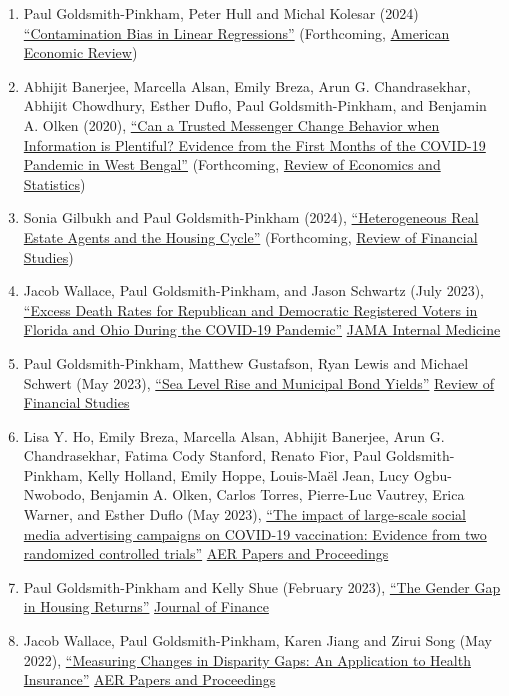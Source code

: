 \documentclass[letterpaper]{article}
\begin{document}
\begin{enumerate}
  \item Paul Goldsmith-Pinkham, Peter Hull and Michal Kolesar (2024) \href{https://arxiv.org/abs/2106.05024}{``Contamination Bias in Linear Regressions''} (Forthcoming, \ul{American Economic Review})
  \item Abhijit Banerjee, Marcella Alsan, Emily Breza, Arun G. Chandrasekhar, Abhijit Chowdhury, Esther Duflo, Paul Goldsmith-Pinkham, and Benjamin A. Olken (2020), \href{https://economics.mit.edu/sites/default/files/2022-08/wb_manuscript_final.pdf}{``Can a Trusted Messenger Change Behavior when Information is Plentiful? Evidence from the First Months of the COVID-19 Pandemic in West Bengal''}  (Forthcoming, \ul{Review of Economics and Statistics})
  \item Sonia Gilbukh and Paul Goldsmith-Pinkham (2024), \href{http://paulgp.github.io/papers/Heterogeneous_Real_Estate_Agents_and_the_Housing_Cycle.pdf}{``Heterogeneous Real Estate Agents and the Housing Cycle''} (Forthcoming, \ul{Review of Financial Studies})
\item Jacob Wallace, Paul Goldsmith-Pinkham, and Jason Schwartz (July 2023), \href{https://jamanetwork.com/journals/jamainternalmedicine/fullarticle/2807617}{``Excess Death Rates for Republican and Democratic Registered Voters in Florida and Ohio During the COVID-19 Pandemic''} \ul{JAMA Internal Medicine}
\item Paul Goldsmith-Pinkham, Matthew Gustafson, Ryan Lewis and Michael Schwert (May 2023), \href{http://paulgp.github.io/papers/ggls_munis.pdf}{``Sea Level Rise and Municipal Bond Yields''} \ul{Review of Financial Studies}
\item Lisa Y. Ho, Emily Breza, Marcella Alsan, Abhijit Banerjee, Arun G. Chandrasekhar, Fatima Cody Stanford, Renato Fior, Paul Goldsmith-Pinkham, Kelly Holland, Emily Hoppe, Louis-Maël Jean, Lucy Ogbu-Nwobodo, Benjamin A. Olken, Carlos Torres, Pierre-Luc Vautrey, Erica Warner, and Esther Duflo (May 2023), \href{https://paulgp.github.io/papers/submission_manuscript_appendix_social_media_covid_vaccines.pdf}{``The impact of large-scale social media advertising campaigns on COVID-19 vaccination: Evidence from two randomized controlled trials''} \ul{AER Papers and Proceedings}
\item Paul Goldsmith-Pinkham and Kelly Shue (February 2023), \href{https://paulgp.github.io/papers/Gender_Gap_in_Housing_Returns.pdf}{``The Gender Gap in Housing Returns''} \ul{Journal of Finance}
\item  Jacob Wallace, Paul Goldsmith-Pinkham, Karen Jiang and Zirui Song (May 2022), \href{https://paulgp.github.io/papers/aerpp_medicare.pdf}{``Measuring Changes in Disparity Gaps: An Application to Health Insurance''} \ul{AER Papers and Proceedings}

\end{enumerate}
\end{document}
